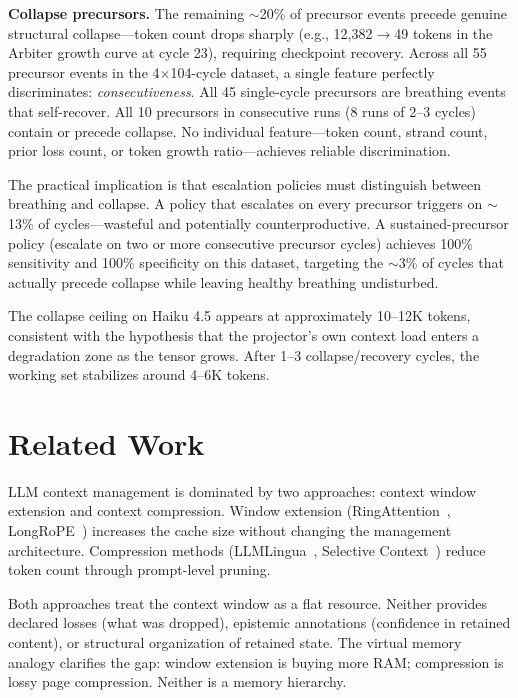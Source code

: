 \documentclass[11pt]{article}
\begin{document}
\textbf{Collapse precursors.} The remaining $\sim$20\% of precursor
events precede genuine structural collapse---token count drops sharply
(e.g., 12,382$\rightarrow$49 tokens in the Arbiter growth curve at
cycle 23), requiring checkpoint recovery. Across all 55 precursor
events in the 4$\times$104-cycle dataset, a single feature perfectly
discriminates: \emph{consecutiveness}. All 45 single-cycle precursors
are breathing events that self-recover. All 10 precursors in
consecutive runs (8 runs of 2--3 cycles) contain or precede collapse.
No individual feature---token count, strand count, prior loss count,
or token growth ratio---achieves reliable discrimination.

The practical implication is that escalation policies must distinguish
between breathing and collapse. A policy that escalates on every
precursor triggers on $\sim$13\% of cycles---wasteful and potentially
counterproductive. A sustained-precursor policy (escalate on two or
more consecutive precursor cycles) achieves 100\% sensitivity and
100\% specificity on this dataset, targeting the $\sim$3\% of cycles
that actually precede collapse while leaving healthy breathing
undisturbed.

The collapse ceiling on Haiku 4.5 appears at approximately 10--12K
tokens, consistent with the hypothesis that the projector's own
context load enters a degradation zone as the tensor grows. After
1--3 collapse/recovery cycles, the working set stabilizes around
4--6K tokens.

\section{Related Work}

LLM context management is dominated by two approaches: context window
extension and context compression. Window extension
(RingAttention~\cite{liu2023ring}, LongRoPE~\cite{ding2024longrope})
increases the cache size without changing the management architecture.
Compression methods (LLMLingua~\cite{jiang2023llmlingua}, Selective
Context~\cite{li2023compressing}) reduce token count through
prompt-level pruning.

Both approaches treat the context window as a flat resource.
Neither provides declared losses (what was dropped), epistemic
annotations (confidence in retained content), or structural
organization of retained state. The virtual memory analogy clarifies
the gap: window extension is buying more RAM; compression is lossy
page compression. Neither is a memory hierarchy.
\end{document}
